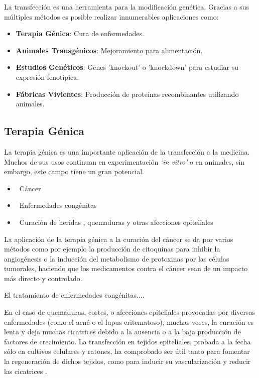 \documentclass[fleqn,10pt]{SelfArx} %
\begin{document}
La transfección es una herramienta para la modificación genética. Gracias a sus múltiples métodos es posible realizar innumerables aplicaciones como:
\begin{itemize}[noitemsep] %
\item \textbf{Terapia Génica}: Cura de enfermedades.
\item \textbf{Animales Transgénicos}: Mejoramiento para alimentación.
\item \textbf{Estudios Genéticos}: Genes 'knockout' o 'knockdown' para estudiar su expresión fenotípica.
\item \textbf{Fábricas Vivientes}: Producción de proteínas recombinantes utilizando animales.
\end{itemize}


\subsection{\textbf{Terapia Génica}}

La terapia génica es una importante aplicación de la transfección a la medicina. Muchos de sus usos continuan en experimentación \textit{'in vitro'} o en animales, sin embargo, este campo tiene un gran potencial.
\begin{itemize}[noitemsep] %
\item \ Cáncer
\item \ Enfermedades congénitas
\item \ Curación de heridas , quemaduras y otras afecciones epiteliales
\end{itemize}

La aplicación de la terapia génica a la curación del cáncer  se da por varios métodos como por ejemplo la producción de citoquinas para inhibir la angiogénesis o la inducción del metabolismo de protoxinas por las células tumorales, haciendo que los medicamentos contra el cáncer sean de un impacto más directo y controlado\cite{Vile}.

El tratamiento de enfermedades congénitas....

En el caso de quemaduras, cortes, o afecciones epiteliales provocadas por diversas enfermedades (como el acné o el lupus eritematoso), muchas veces, la curación es lenta y deja muchas cicatrices debido a la ausencia o a la baja producción de factores de crecimiento. La transfección en tejidos epiteliales, probada a la fecha sólo en cultivos celulares y ratones, ha comprobado ser útil tanto para fomentar la regeneración de dichos tejidos, como para inducir su vascularización y reducir las cicatrices \cite{branskigene2006}.
\end{document}
